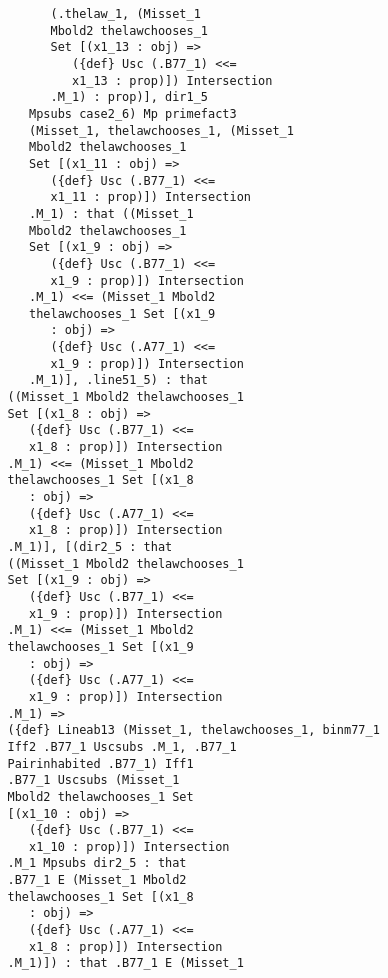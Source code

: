 \documentclass[12pt]{article}
\begin{document}
\begin{verbatim}
                      (.thelaw_1, (Misset_1 
                      Mbold2 thelawchooses_1 
                      Set [(x1_13 : obj) => 
                         ({def} Usc (.B77_1) <<= 
                         x1_13 : prop)]) Intersection 
                      .M_1) : prop)], dir1_5 
                   Mpsubs case2_6) Mp primefact3 
                   (Misset_1, thelawchooses_1, (Misset_1 
                   Mbold2 thelawchooses_1 
                   Set [(x1_11 : obj) => 
                      ({def} Usc (.B77_1) <<= 
                      x1_11 : prop)]) Intersection 
                   .M_1) : that ((Misset_1 
                   Mbold2 thelawchooses_1 
                   Set [(x1_9 : obj) => 
                      ({def} Usc (.B77_1) <<= 
                      x1_9 : prop)]) Intersection 
                   .M_1) <<= (Misset_1 Mbold2 
                   thelawchooses_1 Set [(x1_9 
                      : obj) => 
                      ({def} Usc (.A77_1) <<= 
                      x1_9 : prop)]) Intersection 
                   .M_1)], .line51_5) : that 
                ((Misset_1 Mbold2 thelawchooses_1 
                Set [(x1_8 : obj) => 
                   ({def} Usc (.B77_1) <<= 
                   x1_8 : prop)]) Intersection 
                .M_1) <<= (Misset_1 Mbold2 
                thelawchooses_1 Set [(x1_8 
                   : obj) => 
                   ({def} Usc (.A77_1) <<= 
                   x1_8 : prop)]) Intersection 
                .M_1)], [(dir2_5 : that 
                ((Misset_1 Mbold2 thelawchooses_1 
                Set [(x1_9 : obj) => 
                   ({def} Usc (.B77_1) <<= 
                   x1_9 : prop)]) Intersection 
                .M_1) <<= (Misset_1 Mbold2 
                thelawchooses_1 Set [(x1_9 
                   : obj) => 
                   ({def} Usc (.A77_1) <<= 
                   x1_9 : prop)]) Intersection 
                .M_1) => 
                ({def} Lineab13 (Misset_1, thelawchooses_1, binm77_1 
                Iff2 .B77_1 Uscsubs .M_1, .B77_1 
                Pairinhabited .B77_1) Iff1 
                .B77_1 Uscsubs (Misset_1 
                Mbold2 thelawchooses_1 Set 
                [(x1_10 : obj) => 
                   ({def} Usc (.B77_1) <<= 
                   x1_10 : prop)]) Intersection 
                .M_1 Mpsubs dir2_5 : that 
                .B77_1 E (Misset_1 Mbold2 
                thelawchooses_1 Set [(x1_8 
                   : obj) => 
                   ({def} Usc (.A77_1) <<= 
                   x1_8 : prop)]) Intersection 
                .M_1)]) : that .B77_1 E (Misset_1 

\end{verbatim}
\end{document}
